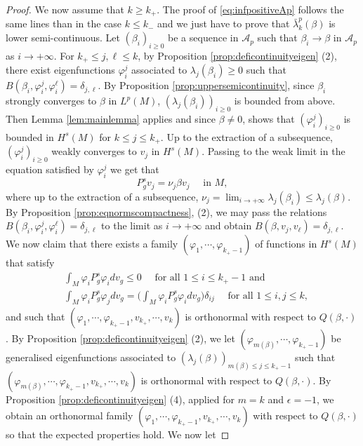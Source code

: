 \documentclass[10pt]{amsart}
\numberwithin{equation}{section}
\def\ep{{\varepsilon}}
\newcommand{\vp}{\varphi}
\def \ep{\epsilon}
\theoremstyle{plain}
\theoremstyle{remark}
\begin{document}
\begin{proof}
We now assume that $k \geq k_+$. %
The proof of \eqref{eq:infpositiveAp} follows the same lines than in the case $k \leq k_-$ and we just have to prove that $ \bar{\lambda}_k^p(\beta)$ is lower semi-continuous. 
Let $(\beta_i)_{i\geq 0}$ be a sequence in $\mathcal{A}_p$ such that $\beta_i \to \beta$ in $\mathcal{A}_p$ as $i \to + \infty$. For $k_+ \leq j, \ell \leq k$, by Proposition \ref{prop:deficontinuityeigen} (2), there exist eigenfunctions $\vp_i^j$ associated to $\lambda_j(\beta_i) \geq 0$ such that $B(\beta_i,\vp_i^j,\vp_i^\ell) = \delta_{j,\ell}$. By Proposition \ref{prop:uppersemicontinuity}, since $\beta_i$ strongly converges to $\beta$ in $L^p(M)$, $\left(\lambda_j(\beta_i)\right)_{i \geq 0}$ is bounded from above. Then Lemma \ref{lem:mainlemma} applies and since $\beta \neq 0$, shows that $(\vp_i^j)_{i\geq 0}$ is bounded in $H^s(M)$ for $k \le j \le k_+$. Up to the extraction of a subsequence, $(\vp_i^j)_{i\geq 0}$ weakly converges to $v_j$ in $H^s(M)$. Passing to the weak limit in the equation satisfied by $\vp_i^j$ we get that 
$$ P_g^s v_j = \nu_j \beta v_j \quad \text{ in } M,$$
where up to the extraction of a subsequence, $\nu_j = \lim_{i\to +\infty} \lambda_j(\beta_i) \leq \lambda_j(\beta)$. 
By Proposition \ref{prop:eqnormscompactness}, (2), we may pass the relations  $B(\beta_i,\vp_i^j,\vp_i^{\ell}) = \delta_{j,\ell}$ to the limit as $i \to + \infty$ and obtain $B(\beta,v_j,v_\ell) = \delta_{j,\ell}$. 
We now claim that there exists a family $(\vp_1, \cdots, \vp_{k_+-1})$ of functions in $H^s(M)$ that satisfy 
  $$ \begin{aligned}
  &   \int_M \vp_i P_g^s \vp_i dv_g \le 0 \quad \text{ for all } 1 \le i \le k_+-1 \text{ and } \\
  &   \int_M \vp_i  P_g^s \vp_j dv_g = \Big(\int_M \vp_i P_g^s \vp_i dv_g\Big) \delta_{ij}  \quad \text{ for all } 1 \le i,j \le k,
    \end{aligned} $$ 
and such that $(\vp_1, \cdots, \vp_{k_+-1}, v_{k_+}, \cdots, v_k)$  is orthonormal with respect to $Q(\beta,\cdot)$. By Proposition \ref{prop:deficontinuityeigen} (2), we let $(\vp_{m(\beta)},\cdots, \vp_{k_+ -1})$ be generalised eigenfunctions associated to $\left(\lambda_{j}(\beta)\right)_{m(\beta)\leq j \leq k_+-1}$ such that $(\vp_{m(\beta)},\cdots, \vp_{k_+ -1},v_{k_+},\cdots, v_k)$ is orthonormal with respect to $Q(\beta,\cdot)$. By Proposition \ref{prop:deficontinuityeigen} (4), applied for $m=k$ and $\ep = -1$, we obtain an orthonormal family $(\vp_{1},\cdots, \vp_{k_+ -1},v_{k_+},\cdots, v_k)$ with respect to $Q(\beta,\cdot)$ so that the expected properties hold. We now let 

\end{proof}
\end{document}
